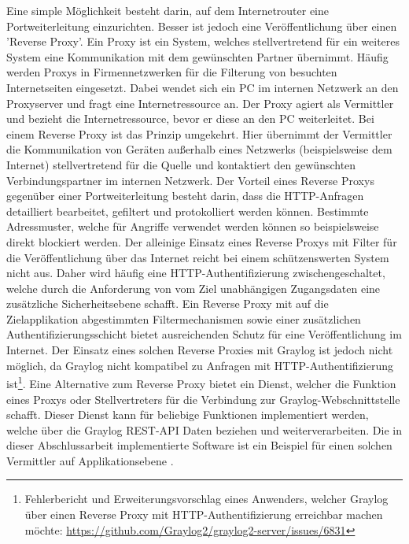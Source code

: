 Eine simple Möglichkeit besteht darin, auf dem Internetrouter eine Portweiterleitung einzurichten. Besser ist jedoch eine Veröffentlichung über einen 'Reverse Proxy'. Ein Proxy ist ein System, welches stellvertretend für ein weiteres System eine Kommunikation mit dem gewünschten Partner übernimmt. Häufig werden Proxys in Firmennetzwerken für die Filterung von besuchten Internetseiten eingesetzt. Dabei wendet sich ein PC im internen Netzwerk an den Proxyserver und fragt eine Internetressource an. Der Proxy agiert als Vermittler und bezieht die Internetressource, bevor er diese an den PC weiterleitet. Bei einem Reverse Proxy ist das Prinzip umgekehrt. Hier übernimmt der Vermittler die Kommunikation von Geräten außerhalb eines Netzwerks (beispielsweise dem Internet) stellvertretend für die Quelle und kontaktiert den gewünschten Verbindungspartner im internen Netzwerk. Der Vorteil eines Reverse Proxys gegenüber einer Portweiterleitung besteht darin, dass die HTTP-Anfragen detailliert bearbeitet, gefiltert und protokolliert werden können. Bestimmte Adressmuster, welche für Angriffe verwendet werden können so beispielsweise direkt blockiert werden. Der alleinige Einsatz eines Reverse Proxys mit Filter für die Veröffentlichung über das Internet reicht bei einem schützenswerten System nicht aus. Daher wird häufig eine HTTP-Authentifizierung zwischengeschaltet, welche durch die Anforderung von vom Ziel unabhängigen Zugangsdaten eine zusätzliche Sicherheitsebene schafft. Ein Reverse Proxy mit auf die Zielapplikation abgestimmten Filtermechanismen sowie einer zusätzlichen Authentifizierungsschicht bietet ausreichenden Schutz für eine Veröffentlichung im Internet. Der Einsatz eines solchen Reverse Proxies mit Graylog ist jedoch nicht möglich, da Graylog nicht kompatibel zu Anfragen mit HTTP-Authentifizierung ist\footnote{Fehlerbericht und Erweiterungsvorschlag eines Anwenders, welcher Graylog über einen Reverse Proxy mit HTTP-Authentifizierung erreichbar machen möchte: \url{https://github.com/Graylog2/graylog2-server/issues/6831}}. Eine Alternative zum Reverse Proxy bietet ein Dienst, welcher die Funktion eines Proxys oder Stellvertreters für die Verbindung zur Graylog-Webschnittstelle schafft. Dieser Dienst kann für beliebige Funktionen implementiert werden, welche über die Graylog REST-API Daten beziehen und weiterverarbeiten. Die in dieser Abschlussarbeit implementierte Software ist ein Beispiel für einen solchen Vermittler auf Applikationsebene \cite[S. 12 ff.]{bsi-websec}.
